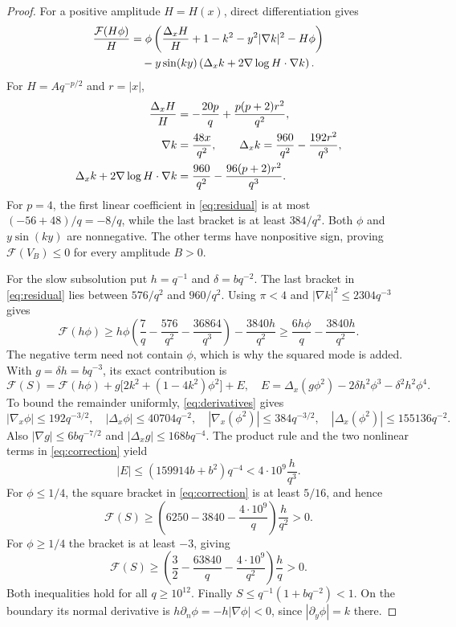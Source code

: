 \documentclass[11pt]{article}
\newcommand{\F}{\mathcal F}
\begin{document}
\begin{proof}
For a positive amplitude $H=H(x)$, direct differentiation gives
\begin{align}\label{eq:residual}
 \frac{\F(H\phi)}{H}
 &=\phi\left(\frac{\Delta_xH}{H}+1-k^2-y^2|\nabla k|^2-H\phi\right)\notag\\
 &\quad-y\sin(ky)\left(\Delta_xk+2\nabla\log H\cdot\nabla k\right).
\end{align}
For $H=Aq^{-p/2}$ and $r=|x|$,
\begin{align}\label{eq:derivatives}
 \frac{\Delta_xH}{H}&=-\frac{20p}{q}+\frac{p(p+2)r^2}{q^2},\notag\\
 \nabla k&=\frac{48x}{q^2},\qquad
 \Delta_xk=\frac{960}{q^2}-\frac{192r^2}{q^3},\notag\\
 \Delta_xk+2\nabla\log H\cdot\nabla k
 &=\frac{960}{q^2}-\frac{96(p+2)r^2}{q^3}.
\end{align}
For $p=4$, the first linear coefficient in \eqref{eq:residual} is at most
$(-56+48)/q=-8/q$, while the last bracket is at least $384/q^2$.
Both $\phi$ and $y\sin(ky)$ are nonnegative. The other terms have nonpositive
sign, proving $\F(V_B)\leq0$ for every amplitude $B>0$.

For the slow subsolution put $h=q^{-1}$ and $\delta=bq^{-2}$.
The last bracket in \eqref{eq:residual} lies between $576/q^2$ and $960/q^2$.
Using $\pi<4$ and $|\nabla k|^2\leq2304q^{-3}$ gives
\begin{equation}\label{eq:uncorrected}
 \F(h\phi)\geq h\phi\left(\frac7q-\frac{576}{q^2}-\frac{36864}{q^3}\right)
                   -\frac{3840h}{q^2}
 \geq\frac{6h\phi}{q}-\frac{3840h}{q^2}.
\end{equation}
The negative term need not contain $\phi$, which is why the squared mode is
added. With $g=\delta h=bq^{-3}$, its exact contribution is
\begin{equation}\label{eq:correction}
 \F(S)=\F(h\phi)+g\bigl[2k^2+(1-4k^2)\phi^2\bigr]+E,
 \quad E=\Delta_x(g\phi^2)-2\delta h^2\phi^3-\delta^2h^2\phi^4.
\end{equation}
To bound the remainder uniformly, \eqref{eq:derivatives} gives
\[
 |\nabla_x\phi|\leq192q^{-3/2},\quad
 |\Delta_x\phi|\leq40704q^{-2},\quad
 |\nabla_x(\phi^2)|\leq384q^{-3/2},\quad
 |\Delta_x(\phi^2)|\leq155136q^{-2}.
\]
Also $|\nabla g|\leq6bq^{-7/2}$ and $|\Delta_xg|\leq168bq^{-4}$.
The product rule and the two nonlinear terms in \eqref{eq:correction} yield
\begin{equation}\label{eq:error}
 |E|\leq(159914b+b^2)q^{-4}<4\cdot10^9\frac{h}{q^3}.
\end{equation}
For $\phi\leq1/4$, the square bracket in \eqref{eq:correction} is at least
$5/16$, and hence
\[
 \F(S)\geq\left(6250-3840-\frac{4\cdot10^9}{q}\right)\frac{h}{q^2}>0.
\]
For $\phi\geq1/4$ the bracket is at least $-3$, giving
\[
 \F(S)\geq\left(\frac32-\frac{63840}{q}-\frac{4\cdot10^9}{q^2}\right)
                 \frac hq>0.
\]
Both inequalities hold for all $q\geq10^{12}$.
Finally $S\leq q^{-1}(1+bq^{-2})<1$. On the boundary its normal derivative
is $h\partial_n\phi=-h|\nabla\phi|<0$, since
$|\partial_y\phi|=k$ there.
\end{proof}
\end{document}
